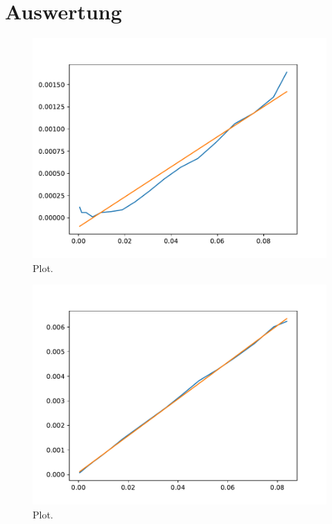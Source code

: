 \section{Auswertung}
\label{sec:Auswertung}





\begin{figure}
  \centering
  \includegraphics{./plots/Stange1.pdf}
  \caption{Plot.}
  \label{fig:plot}
\end{figure}





\begin{figure}
  \centering
  \includegraphics{./plots/Stange2.pdf}
  \caption{Plot.}
  \label{fig:plot}
\end{figure}

